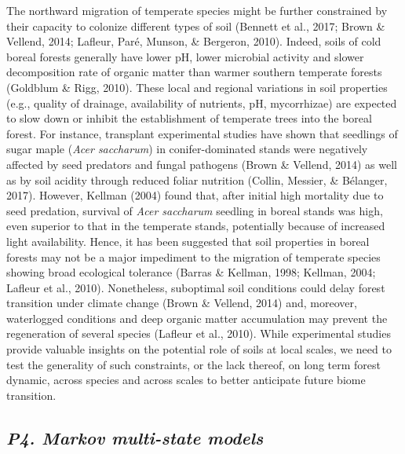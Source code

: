 \documentclass[a4paperpaper,]{article}
\begin{document}
The northward migration of temperate species might be further
constrained by their capacity to colonize different types of soil
(Bennett et al., 2017; Brown \& Vellend, 2014; Lafleur, Paré, Munson, \&
Bergeron, 2010). Indeed, soils of cold boreal forests generally have
lower pH, lower microbial activity and slower decomposition rate of
organic matter than warmer southern temperate forests (Goldblum \& Rigg,
2010). These local and regional variations in soil properties (e.g.,
quality of drainage, availability of nutrients, pH, mycorrhizae) are
expected to slow down or inhibit the establishment of temperate trees
into the boreal forest. For instance, transplant experimental studies
have shown that seedlings of sugar maple (\emph{Acer saccharum}) in
conifer-dominated stands were negatively affected by seed predators and
fungal pathogens (Brown \& Vellend, 2014) as well as by soil acidity
through reduced foliar nutrition (Collin, Messier, \& Bélanger, 2017).
However, Kellman (2004) found that, after initial high mortality due to
seed predation, survival of \emph{Acer saccharum} seedling in boreal
stands was high, even superior to that in the temperate stands,
potentially because of increased light availability. Hence, it has been
suggested that soil properties in boreal forests may not be a major
impediment to the migration of temperate species showing broad
ecological tolerance (Barras \& Kellman, 1998; Kellman, 2004; Lafleur et
al., 2010). Nonetheless, suboptimal soil conditions could delay forest
transition under climate change (Brown \& Vellend, 2014) and, moreover,
waterlogged conditions and deep organic matter accumulation may prevent
the regeneration of several species (Lafleur et al., 2010). While
experimental studies provide valuable insights on the potential role of
soils at local scales, we need to test the generality of such
constraints, or the lack thereof, on long term forest dynamic, across
species and across scales to better anticipate future biome transition.

\hypertarget{p4.-markov-multi-state-models}{%
\subsection{\texorpdfstring{\emph{P4. Markov multi-state
models}}{P4. Markov multi-state models}}\label{p4.-markov-multi-state-models}}
\end{document}
